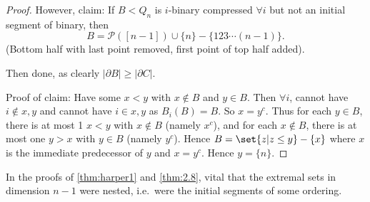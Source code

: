 \documentclass{article}
\begin{document}
\begin{proof}
  However, claim: If $B< Q_n$ is $i$-binary compressed $\forall i$ but not an initial segment of binary, then
  \begin{equation*}B = \mathcal{P}([n-1]) \cup \{n\} - \{123\dotsm(n-1)\}.\end{equation*}
  (Bottom half with last point removed, first point of top half added).
  \begin{center}
  \end{center}
  Then done, as clearly $|\partial B| \geq |\partial C|$.

  Proof of claim:
  Have some $x < y$ with $x \notin B$ and $y \in B$.
  Then $\forall i$, cannot have $i \notin x,y$ and cannot have $i \in x,y$ as $B_i(B) = B$.
  So $x = y^c$.
  Thus for each $y \in B$, there is at most 1 $x < y$ with $x \notin B$ (namely $x^c$), and for each $x \notin B$, there is at most one $y > x$ with $y \in B$ (namely $y^c$).
  Hence $B = \set{z | z \leq y} - \{x\}$ where $x$ is the immediate predecessor of $y$ and $x = y^c$.
  Hence $y = \{n\}$.
\end{proof}
\begin{remark}
  In the proofs of \cref{thm:harper1} and \cref{thm:2.8}, vital that the extremal sets in dimension $n-1$ were nested, i.e.\ were the initial segments of some ordering.
\end{remark}
\end{document}
